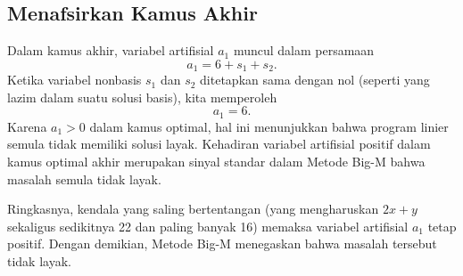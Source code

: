 \subsection*{Menafsirkan Kamus Akhir}

Dalam kamus akhir, variabel artifisial \(a_1\) muncul dalam persamaan
\[
a_1 = 6 + s_1 + s_2.
\]
Ketika variabel nonbasis \(s_1\) dan \(s_2\) ditetapkan sama dengan nol (seperti yang lazim dalam suatu solusi basis), kita memperoleh
\[
a_1 = 6.
\]
Karena \(a_1 > 0\) dalam kamus optimal, hal ini menunjukkan bahwa program linier semula tidak memiliki solusi layak. Kehadiran variabel artifisial positif dalam kamus optimal akhir merupakan sinyal standar dalam Metode Big-M bahwa masalah semula tidak layak.

\bigskip

\noindent Ringkasnya, kendala yang saling bertentangan (yang mengharuskan \(2x+y\) sekaligus sedikitnya 22 dan paling banyak 16) memaksa variabel artifisial \(a_1\) tetap positif. Dengan demikian, Metode Big-M menegaskan bahwa masalah tersebut tidak layak.

